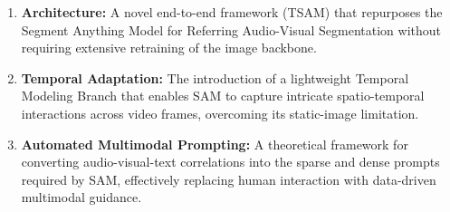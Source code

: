 \begin{enumerate}
    \item \textbf{Architecture:} A novel end-to-end framework (TSAM) that repurposes the Segment Anything Model for Referring Audio-Visual Segmentation without requiring extensive retraining of the image backbone.
    \item \textbf{Temporal Adaptation:} The introduction of a lightweight Temporal Modeling Branch that enables SAM to capture intricate spatio-temporal interactions across video frames, overcoming its static-image limitation.
    \item \textbf{Automated Multimodal Prompting:} A theoretical framework for converting audio-visual-text correlations into the sparse and dense prompts required by SAM, effectively replacing human interaction with data-driven multimodal guidance.
\end{enumerate}